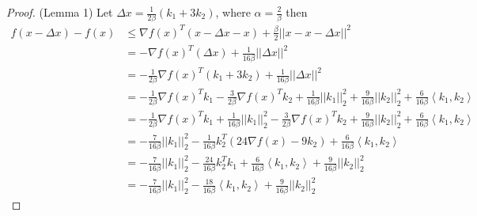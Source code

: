 
\begin{proof}(Lemma 1)
Let $\Delta x =  \frac{1}{2\beta}(k_1 + 3k_2)$, where $\alpha = \frac{2}{\beta}$ then
\begin{equation}
\begin{aligned}\label{ineq0}
f(x - \Delta x) - f(x) &\leq \nabla f(x)^T (x - \Delta x - x) + \frac{\beta}{2} || x - x - \Delta x ||^2 \\
&= -  \nabla f(x)^T ( \Delta x) + \frac{1}{16 \beta} || \Delta x ||^2 \\
&= -\frac{1}{2 \beta} \nabla  f(x)^T ( k_1 + 3k_2) + \frac{1}{16 \beta} || \Delta x ||^2 \\
&= -\frac{1}{2\beta}\nabla f(x)^T k_1 - \frac{3}{2\beta}\nabla f(x)^T k_2 + \frac{1}{16 \beta} || k_1 ||_2^2 + \frac{9}{16 \beta} || k_2 ||^2_2 + \frac{6}{16\beta}\left\langle k_1, k_2 \right\rangle \\
&= -\frac{1}{2\beta}\nabla f(x)^T k_1 +  \frac{1}{16 \beta} || k_1 ||_2^2 -  \frac{3}{2\beta}\nabla f(x)^T k_2 +  \frac{9}{16 \beta} || k_2 ||^2_2  + \frac{6}{16\beta}\left\langle k_1, k_2 \right\rangle \\
&= -\frac{7}{16 \beta}|| k_1 ||_2^2 -\frac{1}{16 \beta}k_2^T(24 \nabla f(x) - 9 k_2) + \frac{6}{16\beta}\left\langle k_1, k_2 \right\rangle \\
&= -\frac{7}{16 \beta}|| k_1 ||_2^2 - \frac{24}{16 \beta}k_2^Tk_1 + \frac{6}{16 \beta}\left\langle k_1, k_2 \right\rangle + \frac{9}{16\beta}|| k_2 ||_2^2 \\
&= -\frac{7}{16 \beta}|| k_1 ||_2^2 - \frac{18}{16 \beta} \left\langle k_1, k_2 \right\rangle + \frac{9}{16 \beta}|| k_2 ||_2^2
\end{aligned}
\end{equation}


\end{proof}
